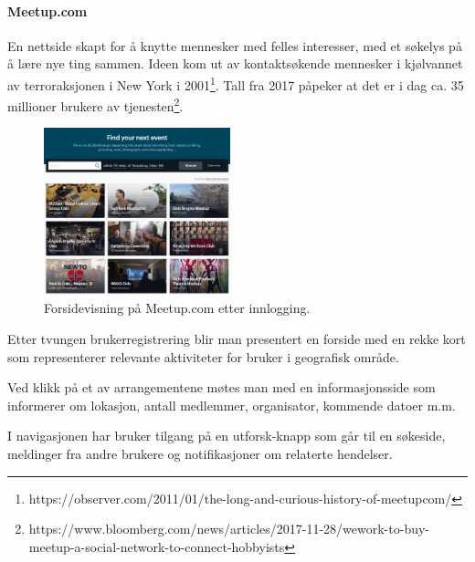 \paragraph{Meetup.com} En nettside skapt for å knytte mennesker med felles interesser, med et søkelys på å lære nye ting sammen. Ideen kom ut av kontaktsøkende mennesker i kjølvannet av terroraksjonen i New York i 2001\footnote{https://observer.com/2011/01/the-long-and-curious-history-of-meetupcom/}. Tall fra 2017 påpeker at det er i dag ca. 35 millioner brukere av tjenesten\footnote{https://www.bloomberg.com/news/articles/2017-11-28/wework-to-buy-meetup-a-social-network-to-connect-hobbyists}.
\begin{figure}
  \begin{center}
    \includegraphics[width=0.48\textwidth]{Illustrasjoner/andre_platformer/meetup_forside.png}
  \end{center}
  \caption{Forsidevisning på Meetup.com etter innlogging.}
\end{figure}

Etter tvungen brukerregistrering blir man presentert en forside med en rekke kort som representerer relevante aktiviteter for bruker i geografisk område. 

\vspace{5mm} %

Ved klikk på et av arrangementene møtes man med en informasjonsside som informerer om lokasjon, antall medlemmer, organisator, kommende datoer m.m.

\vspace{5mm} %

I navigasjonen har bruker tilgang på en utforsk-knapp som går til en søkeside, meldinger fra andre brukere og notifikasjoner om relaterte hendelser.

\vspace{5mm} %

